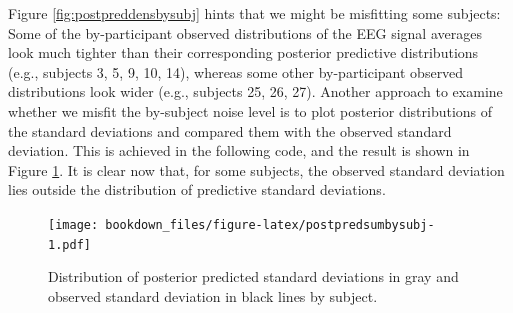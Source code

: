 \documentclass[12pt,]{krantz}
\newenvironment{Shaded}{\begin{snugshade}}{\end{snugshade}}
\newcommand{\KeywordTok}[1]{\textcolor[rgb]{0.13,0.29,0.53}{\textbf{#1}}}
\newcommand{\DataTypeTok}[1]{\textcolor[rgb]{0.13,0.29,0.53}{#1}}
\newcommand{\DecValTok}[1]{\textcolor[rgb]{0.00,0.00,0.81}{#1}}
\newcommand{\StringTok}[1]{\textcolor[rgb]{0.31,0.60,0.02}{#1}}
\newcommand{\CommentTok}[1]{\textcolor[rgb]{0.56,0.35,0.01}{\textit{#1}}}
\newcommand{\OtherTok}[1]{\textcolor[rgb]{0.56,0.35,0.01}{#1}}
\newcommand{\OperatorTok}[1]{\textcolor[rgb]{0.81,0.36,0.00}{\textbf{#1}}}
\newcommand{\NormalTok}[1]{#1}
\theoremstyle{definition}
\theoremstyle{definition}
\theoremstyle{definition}
\theoremstyle{remark}
\begin{document}
Figure \ref{fig:postpreddensbysubj} hints that we might be misfitting
some subjects: Some of the by-participant observed distributions of the
EEG signal averages look much tighter than their corresponding posterior
predictive distributions (e.g., subjects 3, 5, 9, 10, 14), whereas some
other by-participant observed distributions look wider (e.g., subjects
25, 26, 27). Another approach to examine whether we misfit the
by-subject noise level is to plot posterior distributions of the
standard deviations and compared them with the observed standard
deviation. This is achieved in the following code, and the result is
shown in Figure \ref{fig:postpredsumbysubj}. It is clear now that, for
some subjects, the observed standard deviation lies outside the
distribution of predictive standard deviations.





\begin{Shaded}
\end{Shaded}

\begin{figure}
\centering
\texttt{[image: bookdown\_files/figure-latex/postpredsumbysubj-1.pdf]}
\caption{\label{fig:postpredsumbysubj}Distribution of posterior predicted standard
deviations in gray and observed standard deviation in black lines by
subject.}
\end{figure}
\end{document}
